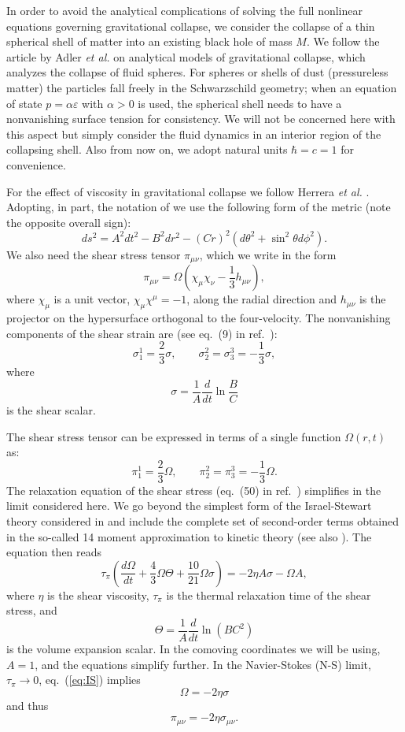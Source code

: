\documentclass[article,twocolumn]{revtex4}
\newcommand{\be}{\begin{equation}}
\newcommand{\ee}{\end{equation}}
\begin{document}
In order to avoid the analytical complications of solving the full nonlinear equations governing gravitational collapse, we consider the collapse of a thin spherical shell of matter into an existing black hole of mass $M$. We follow the article by Adler {\em et al.} \cite{Adler:2005vn} on analytical models of gravitational collapse, which analyzes the collapse of fluid spheres. For spheres or shells of dust (pressureless matter) the particles fall freely in the Schwarzschild geometry; when an equation of state $p = \alpha\varepsilon$ with $\alpha > 0$ is used, the spherical shell needs to have a nonvanishing surface tension for consistency. We will not be concerned here with this aspect but simply consider the fluid dynamics in an interior region of the collapsing shell. Also from now on, we adopt natural units $\hbar = c = 1$ for convenience.

For the effect of viscosity in gravitational collapse we follow Herrera {\em et al.} \cite{Herrera:2008gq}. Adopting, in part, the notation of \cite{Herrera:2008gq} we use the following form of the metric (note the opposite overall sign):
\be
ds^2 = A^2 dt^2 - B^2 dr^2 - (Cr)^2 (d\theta^2 + \sin^2\theta d\phi^2) .
\label{eq:Herrera}
\ee
We also need the shear stress tensor $\pi_{\mu\nu}$, which we write in the form
\be
\pi_{\mu\nu} = \Omega \left(\chi_\mu \chi_\nu - \frac{1}{3} h_{\mu\nu} \right) ,
\ee
where $\chi_\mu$ is a unit vector, $\chi_{\mu}\chi^{\mu}=-1$, along the radial direction and $h_{\mu\nu}$ is the projector on the hypersurface orthogonal to the four-velocity. The nonvanishing components of the shear strain are (see eq.~(9) in ref.~\cite{Herrera:2008gq}):
\be
\sigma_1^1 = \frac{2}{3} \sigma ,
\qquad 
\sigma_2^2 = \sigma_3^3 = - \frac{1}{3} \sigma ,
\ee
where
\be 
\sigma = \frac{1}{A} \frac{d}{dt} \ln \frac{B}{C} 
\label{eq:shear-scalar}
\ee
is the shear scalar. 

The shear stress tensor can be expressed in terms of a single function $\Omega(r,t)$ as:
\be
\pi^1_1 = \frac{2}{3}\Omega, \qquad \pi^2_2 = \pi^3_3 = - \frac{1}{3} \Omega .
\label{eq:pi-ij}
\ee
The relaxation equation of the shear stress (eq.~(50) in ref.~\cite{Herrera:2008gq}) simplifies in the limit considered here. We go beyond the simplest form of the Israel-Stewart theory considered in \cite{Herrera:2008gq} and include the complete set of second-order terms obtained in the so-called 14 moment approximation to kinetic theory \cite{Denicol:2012cn} (see also \cite{Denicol:2014tha}). The equation then reads
\be 
\tau_{\pi} \left( \frac{d\Omega}{dt} +\frac{4}{3} \Omega\Theta + \frac{10}{21} \Omega\sigma \right) 
= - 2 \eta A \sigma - \Omega A ,
\label{eq:IS}
\ee
where $\eta$ is the shear viscosity, $\tau_\pi$ is the thermal relaxation time of the shear stress, and
\be 
\Theta =  \frac{1}{A} \frac{d}{dt} \ln (B C^2) 
\ee 
is the volume expansion scalar. In the comoving coordinates we will be using, $A=1$, and the equations simplify further. 
In the Navier-Stokes (N-S) limit, $\tau_{\pi} \to 0$, eq.~(\ref{eq:IS}) implies
\be
\Omega = - 2\eta\sigma 
\label{eq:N-S}
\ee
and thus
\be 
\pi_{\mu\nu} = - 2 \eta \sigma_{\mu\nu} .
\label{eq:NS-pi}
\ee
\end{document}
